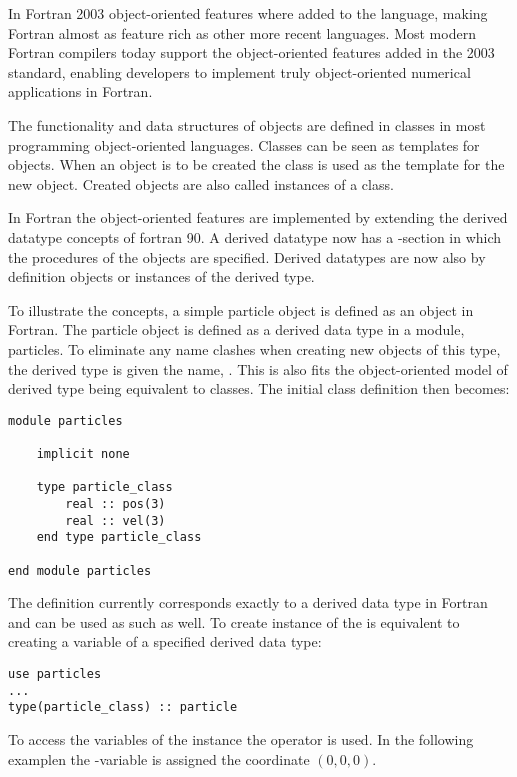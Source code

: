 In Fortran 2003 object-oriented features where added to the language, making Fortran almost as feature rich as other more recent languages. Most modern Fortran compilers today support the object-oriented features added in the 2003 standard, enabling developers to implement truly object-oriented numerical applications in Fortran.

The functionality and data structures of objects are defined in classes in most programming object-oriented languages. Classes can be seen as templates for objects. When an object is to be created the class is used as the template for the new object. Created objects are also called instances of a class.

In Fortran the object-oriented features are implemented by extending the derived datatype concepts of fortran 90. A derived datatype now has a -section in which the procedures of the objects are specified. Derived datatypes are now also by definition objects or instances of the derived type.

To illustrate the concepts, a simple particle object is defined as an object in Fortran. The particle object is defined as a derived data type in a module, particles. To eliminate any name clashes when creating new objects of this type, the derived type is given the name, . This is also fits the object-oriented model of derived type being equivalent to classes. The initial class definition then becomes:

\begin{lstlisting}
module particles

    implicit none

    type particle_class
        real :: pos(3)
        real :: vel(3)
    end type particle_class

end module particles
\end{lstlisting}

The definition currently corresponds exactly to a derived data type in Fortran and can be used as such as well. To create instance of the  is equivalent to creating a variable of a specified derived data type:

\begin{lstlisting}
use particles
...
type(particle_class) :: particle
\end{lstlisting}

To access the variables of the instance the \fkeyw{\%} operator is used. In the following examplen the -variable is assigned the coordinate $(0,0,0)$.

